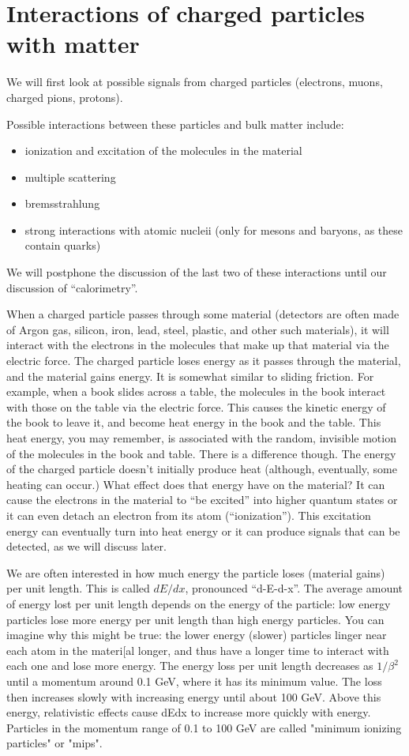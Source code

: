 \section{Interactions of charged particles with matter}
We will first look at possible signals from charged particles (electrons, muons, charged pions, protons).

Possible interactions between these particles and bulk matter include:
\begin{itemize}
\item ionization and excitation of the molecules in the material
\item multiple scattering
\item bremsstrahlung
\item strong interactions with atomic nucleii (only for mesons and baryons, as these contain quarks)
\end{itemize}
We will postphone the discussion of the last two of these interactions until our discussion of ``calorimetry''.

When a charged particle passes through some material (detectors are often made of Argon gas, silicon, iron, lead, steel, plastic, and other such materials), it will interact with the electrons in the molecules that make up that material via the electric force.  
The charged particle loses energy as it passes through the material, and the material gains energy.  
It is somewhat similar to sliding friction.  For example, when a book slides across a table, the molecules in the book interact with those on the table via the electric force.  This causes the kinetic energy of the book to leave it, and become heat energy in the book and the table.  This heat energy, you may remember, is associated with the random, invisible motion of the molecules in the book and table.  There is a difference though.  The energy of the charged particle doesn't initially produce heat (although, eventually, some heating can occur.)
What effect does that energy have on the material?  It can cause the electrons in the material to ``be excited'' into higher quantum states or it can even detach an electron from its atom (``ionization'').  This excitation energy can eventually turn into heat energy or it can produce signals that can be detected, as we will discuss later.

We are often interested in how much energy the particle loses (material gains) per unit length.  This is called $dE/dx$, pronounced ``d-E-d-x''.    The average amount of energy lost per unit length depends on the energy of the particle: low energy particles lose more energy per unit length than high energy particles.  You can imagine why this might be true: the lower energy (slower) particles linger near each atom in the materi[al longer, and thus have a longer time to interact with each one and lose more energy.  The energy loss per unit length decreases as $1/\beta^2$ until a momentum around 0.1 GeV, where it has its minimum value.  The loss then increases slowly with increasing energy until about 100 GeV.  Above this energy, relativistic effects cause dEdx to increase more quickly with energy.  Particles in the momentum range of 0.1 to 100 GeV are called "minimum ionizing particles" or "mips".

